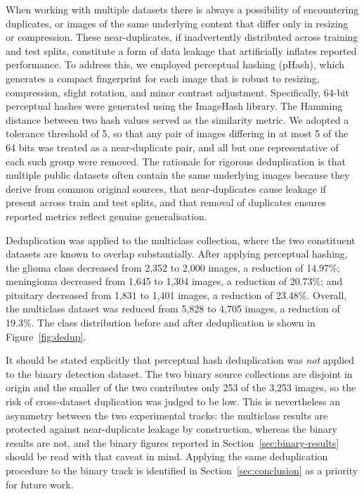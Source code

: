 \documentclass[final,3p,times,number]{elsarticle}
\begin{document}
When working with multiple datasets there is always a possibility of encountering duplicates, or images of the same underlying content that differ only in resizing or compression. These near-duplicates, if inadvertently distributed across training and test splits, constitute a form of data leakage that artificially inflates reported performance. To address this, we employed perceptual hashing (pHash), which generates a compact fingerprint for each image that is robust to resizing, compression, slight rotation, and minor contrast adjustment. Specifically, 64-bit perceptual hashes were generated using the ImageHash library. The Hamming distance between two hash values served as the similarity metric. We adopted a tolerance threshold of 5, so that any pair of images differing in at most 5 of the 64 bits was treated as a near-duplicate pair, and all but one representative of each such group were removed. The rationale for rigorous deduplication is that multiple public datasets often contain the same underlying images because they derive from common original sources, that near-duplicates cause leakage if present across train and test splits, and that removal of duplicates ensures reported metrics reflect genuine generalisation.

Deduplication was applied to the multiclass collection, where the two constituent datasets are known to overlap substantially. After applying perceptual hashing, the glioma class decreased from 2,352 to 2,000 images, a reduction of 14.97\%; meningioma decreased from 1,645 to 1,304 images, a reduction of 20.73\%; and pituitary decreased from 1,831 to 1,401 images, a reduction of 23.48\%. Overall, the multiclass dataset was reduced from 5,828 to 4,705 images, a reduction of 19.3\%. The class distribution before and after deduplication is shown in Figure~\ref{fig:dedup}.

It should be stated explicitly that perceptual hash deduplication was \emph{not} applied to the binary detection dataset. The two binary source collections are disjoint in origin and the smaller of the two contributes only 253 of the 3,253 images, so the risk of cross-dataset duplication was judged to be low. This is nevertheless an asymmetry between the two experimental tracks: the multiclass results are protected against near-duplicate leakage by construction, whereas the binary results are not, and the binary figures reported in Section~\ref{sec:binary-results} should be read with that caveat in mind. Applying the same deduplication procedure to the binary track is identified in Section~\ref{sec:conclusion} as a priority for future work.
\end{document}
